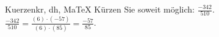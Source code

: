 \begin{MAufgabe}{Kuerzen}{kr, dh, MaTeX}
K\"urzen Sie soweit m\"oglich: $\frac{-342}{510}$.\\ 
\ifLsg\MLoesung
\quad $\frac{-342}{510}=\frac{(6)\cdot(-57)}{(6)\cdot(85)}=\frac{-57}{85}$.\else\relax\fi
 \end{MAufgabe}